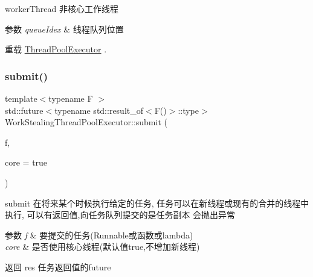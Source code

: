 worker\+Thread 非核心工作线程 


\begin{DoxyParams}{参数}
{\em queue\+Idex} & 线程队列位置 \\
\hline
\end{DoxyParams}


重载 \hyperlink{classThreadPoolExecutor_a5e40839bf4191b5eab9d81227ddb62c3}{Thread\+Pool\+Executor} .

\mbox{\label{classWorkStealingThreadPoolExecutor_a7fa1b79c8be2b06a7952ccfd14aa7f6c}} 
\subsubsection{\texorpdfstring{submit()}{submit()}}
{\footnotesize\ttfamily template$<$typename F $>$ \\
std\+::future$<$typename std\+::result\+\_\+of$<$F()$>$\+::type$>$ Work\+Stealing\+Thread\+Pool\+Executor\+::submit (\begin{DoxyParamCaption}\item[{F}]{f,  }\item[{bool}]{core = {\ttfamily true} }\end{DoxyParamCaption})\hspace{0.3cm}{\ttfamily [inline]}}



submit 在将来某个时候执行给定的任务, 任务可以在新线程或现有的合并的线程中执行, 可以有返回值,向任务队列提交的是任务副本 会抛出异常 


\begin{DoxyParams}{参数}
{\em f} & 要提交的任务(Runnable或函数或lambda) \\
\hline
{\em core} & 是否使用核心线程(默认值true,不增加新线程)\\
\hline
\end{DoxyParams}
\begin{DoxyReturn}{返回}
res 任务返回值的future 
\end{DoxyReturn}
\mbox{\label{classWorkStealingThreadPoolExecutor_a962c0965822cd961984928ec26d61d4e}} 
